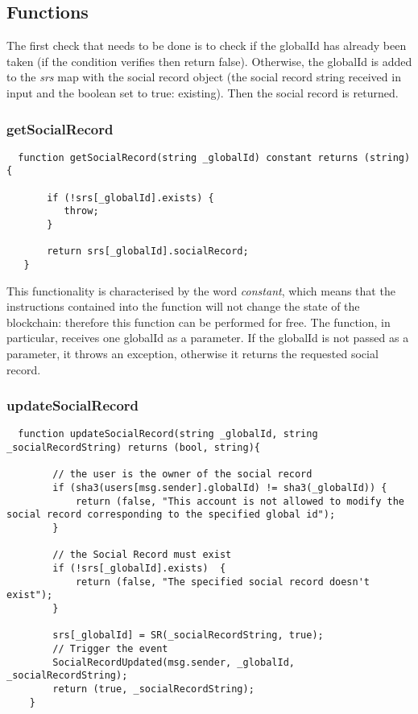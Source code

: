 \subsection{Functions}
The first check that needs to be done is to check if the globalId has already been taken (if the condition verifies then return false).
Otherwise, the globalId is added to the \textit{srs} map with the social record object (the social record string received in input and the boolean set to true: existing). Then the social record is returned.

\subsubsection{getSocialRecord}

\begin{lstlisting}
  function getSocialRecord(string _globalId) constant returns (string) {

       if (!srs[_globalId].exists) {
          throw;
       }

       return srs[_globalId].socialRecord;
   }
\end{lstlisting}
This functionality is characterised by the word \textit{constant}, which means that the instructions contained into the function will not change the state of the blockchain: therefore this function can be performed for free.
The function, in particular, receives one globalId as a parameter. If the globalId is not passed as a parameter, it throws an exception, otherwise it returns the requested social record.

\subsubsection{updateSocialRecord}
\begin{lstlisting}
  function updateSocialRecord(string _globalId, string _socialRecordString) returns (bool, string){

        // the user is the owner of the social record
        if (sha3(users[msg.sender].globalId) != sha3(_globalId)) {
            return (false, "This account is not allowed to modify the social record corresponding to the specified global id");
        }

        // the Social Record must exist
        if (!srs[_globalId].exists)  {
            return (false, "The specified social record doesn't exist");
        }

        srs[_globalId] = SR(_socialRecordString, true);
        // Trigger the event
        SocialRecordUpdated(msg.sender, _globalId, _socialRecordString);
        return (true, _socialRecordString);
    }
\end{lstlisting}

